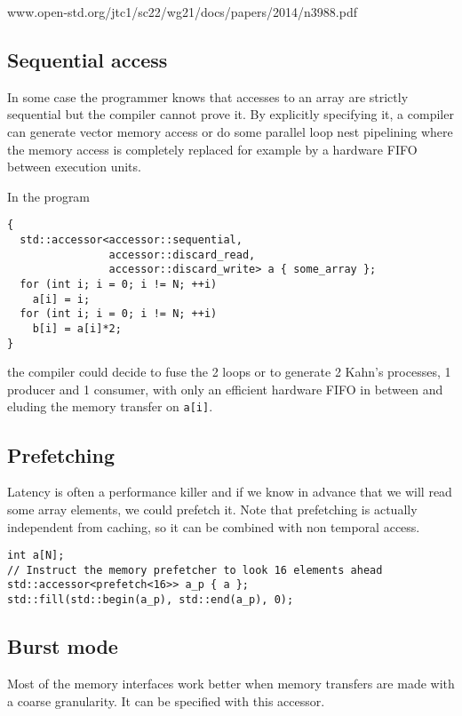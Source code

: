 \documentclass[a4paper]{article}
\begin{document}
  www.open-std.org/jtc1/sc22/wg21/docs/papers/2014/n3988.pdf


\subsection{Sequential access}
\label{sec:sequential-access}

In some case the programmer knows that accesses to an array are
strictly sequential but the compiler cannot prove it. By explicitly
specifying it, a compiler can generate vector memory access or do some
parallel loop nest pipelining where the memory access is completely
replaced for example by a hardware FIFO between execution units.

In the program
\begin{lstlisting}
{
  std::accessor<accessor::sequential,
                accessor::discard_read,
                accessor::discard_write> a { some_array };
  for (int i; i = 0; i != N; ++i)
    a[i] = i;
  for (int i; i = 0; i != N; ++i)
    b[i] = a[i]*2;
}
\end{lstlisting}
the compiler could decide to fuse the 2 loops or to generate 2 Kahn's
processes, 1 producer and 1 consumer, with only an efficient hardware
FIFO in between and eluding the memory transfer on \lstinline|a[i]|.


\subsection{Prefetching}
\label{sec:prefetching}

Latency is often a performance killer and if we know in advance that
we will read some array elements, we could prefetch it. Note that
prefetching is actually independent from caching, so it can be
combined with non temporal access.

\begin{lstlisting}
int a[N];
// Instruct the memory prefetcher to look 16 elements ahead
std::accessor<prefetch<16>> a_p { a };
std::fill(std::begin(a_p), std::end(a_p), 0);
\end{lstlisting}


\subsection{Burst mode}
\label{sec:burst-mode}

Most of the memory interfaces work better when memory transfers are
made with a coarse granularity. It can be specified with this accessor.
\end{document}
